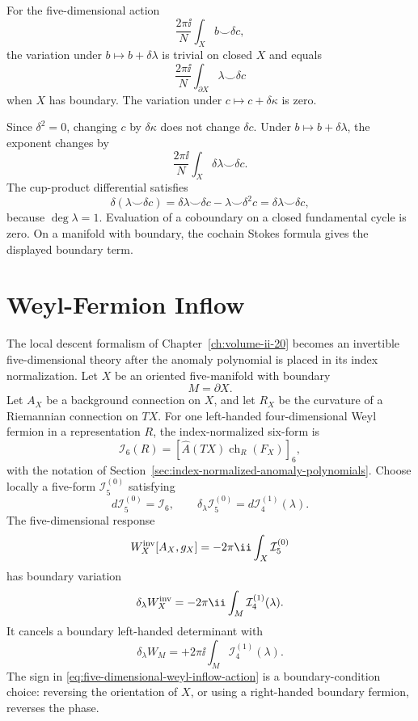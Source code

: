 \begin{remark}
\label{rem:finite-higher-form-bulk-variation}
For the five-dimensional action
\[
  \frac{2\pi\ii}{N}\int_X b\smile\delta c,
\]
the variation under \(b\mapsto b+\delta\lambda\) is trivial on closed \(X\)
and equals
\[
  \frac{2\pi\ii}{N}\int_{\partial X}\lambda\smile\delta c
\]
when \(X\) has boundary.  The variation under
\(c\mapsto c+\delta\kappa\) is zero.

Since \(\delta^2=0\), changing \(c\) by \(\delta\kappa\) does not change
\(\delta c\).  Under \(b\mapsto b+\delta\lambda\), the exponent changes by
\[
  \frac{2\pi\ii}{N}\int_X \delta\lambda\smile\delta c.
\]
The cup-product differential satisfies
\[
  \delta(\lambda\smile\delta c)
  =
  \delta\lambda\smile\delta c
  -\lambda\smile\delta^2c
  =
  \delta\lambda\smile\delta c,
\]
because \(\deg\lambda=1\).  Evaluation of a coboundary on a closed
fundamental cycle is zero.  On a manifold with boundary, the cochain Stokes
formula gives the displayed boundary term.
\end{remark}

\section{Weyl-Fermion Inflow}
\label{sec:four-dimensional-weyl-five-dimensional-inflow}

The local descent formalism of Chapter~\ref{ch:volume-ii-20} becomes an
invertible five-dimensional theory after the anomaly polynomial is placed in
its index normalization.  Let \(X\) be an oriented five-manifold with boundary
\[
  M=\partial X.
\]
Let \(A_X\) be a background connection on \(X\), and let \(R_X\) be the
curvature of a Riemannian connection on \(TX\).  For one left-handed
four-dimensional Weyl fermion in a representation \(R\), the
index-normalized six-form is
\begin{equation}
  \mathcal I_6(R)
  =
  \left[
    \widehat A(TX)\operatorname{ch}_{R}(F_X)
  \right]_6 ,
  \label{eq:volix-index-normalized-six-form}
\end{equation}
with the notation of
Section~\ref{sec:index-normalized-anomaly-polynomials}.  Choose locally a
five-form \(\mathcal I_5^{(0)}\) satisfying
\[
  d\mathcal I_5^{(0)}=\mathcal I_6,
  \qquad
  \delta_\lambda\mathcal I_5^{(0)}
  =
  d\mathcal I_4^{(1)}(\lambda).
\]
The five-dimensional response
\begin{equation}
  W_X^{\rm inv}[A_X,g_X]
  =
  -2\pi\ii\int_X \mathcal I_5^{(0)}
  \label{eq:five-dimensional-weyl-inflow-action}
\end{equation}
has boundary variation
\[
  \delta_\lambda W_X^{\rm inv}
  =
  -2\pi\ii\int_M\mathcal I_4^{(1)}(\lambda).
\]
It cancels a boundary left-handed determinant with
\[
  \delta_\lambda W_M
  =
  +2\pi\ii\int_M\mathcal I_4^{(1)}(\lambda).
\]
The sign in \eqref{eq:five-dimensional-weyl-inflow-action} is a
boundary-condition choice: reversing the orientation of \(X\), or using a
right-handed boundary fermion, reverses the phase.

